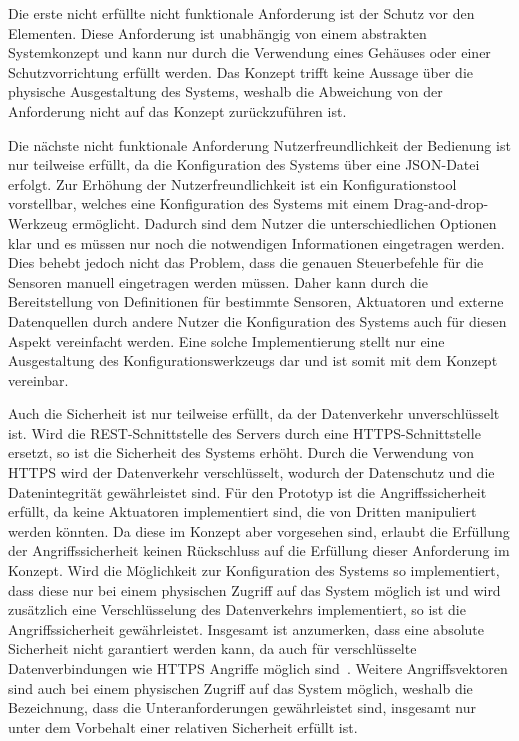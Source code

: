 Die erste nicht erfüllte nicht funktionale Anforderung ist der Schutz vor den Elementen.
Diese Anforderung ist unabhängig von einem abstrakten Systemkonzept und kann nur durch die Verwendung eines Gehäuses oder einer Schutzvorrichtung erfüllt werden.
Das Konzept trifft keine Aussage über die physische Ausgestaltung des Systems, weshalb die Abweichung von der Anforderung nicht auf das Konzept zurückzuführen ist.

Die nächste nicht funktionale Anforderung Nutzerfreundlichkeit der Bedienung ist nur teilweise erfüllt, da die Konfiguration des Systems über eine JSON-Datei erfolgt.
Zur Erhöhung der Nutzerfreundlichkeit ist ein Konfigurationstool vorstellbar, welches eine Konfiguration des Systems mit einem Drag-and-drop-Werkzeug ermöglicht.
Dadurch sind dem Nutzer die unterschiedlichen Optionen klar und es müssen nur noch die notwendigen Informationen eingetragen werden.
Dies behebt jedoch nicht das Problem, dass die genauen Steuerbefehle für die Sensoren manuell eingetragen werden müssen.
Daher kann durch die Bereitstellung von Definitionen für bestimmte Sensoren, Aktuatoren und externe Datenquellen durch andere Nutzer die Konfiguration des Systems auch für diesen Aspekt vereinfacht werden.
Eine solche Implementierung stellt nur eine Ausgestaltung des Konfigurationswerkzeugs dar und ist somit mit dem Konzept vereinbar.

Auch die Sicherheit ist nur teilweise erfüllt, da der Datenverkehr unverschlüsselt ist.
Wird die REST-Schnittstelle des Servers durch eine HTTPS-Schnittstelle ersetzt, so ist die Sicherheit des Systems erhöht.
Durch die Verwendung von HTTPS wird der Datenverkehr verschlüsselt, wodurch der Datenschutz und die Datenintegrität gewährleistet sind.
Für den Prototyp ist die Angriffssicherheit erfüllt, da keine Aktuatoren implementiert sind, die von Dritten manipuliert werden könnten.
Da diese im Konzept aber vorgesehen sind, erlaubt die Erfüllung der Angriffssicherheit keinen Rückschluss auf die Erfüllung dieser Anforderung im Konzept.
Wird die Möglichkeit zur Konfiguration des Systems so implementiert, dass diese nur bei einem physischen Zugriff auf das System möglich ist und wird zusätzlich eine Verschlüsselung des Datenverkehrs implementiert, so ist die Angriffssicherheit gewährleistet.
Insgesamt ist anzumerken, dass eine absolute Sicherheit nicht garantiert werden kann, da auch für verschlüsselte Datenverbindungen wie HTTPS Angriffe möglich sind~\cite{HTTPSAttack}.
Weitere Angriffsvektoren sind auch bei einem physischen Zugriff auf das System möglich, weshalb die Bezeichnung, dass die Unteranforderungen gewährleistet sind, insgesamt nur unter dem Vorbehalt einer relativen Sicherheit erfüllt ist.

